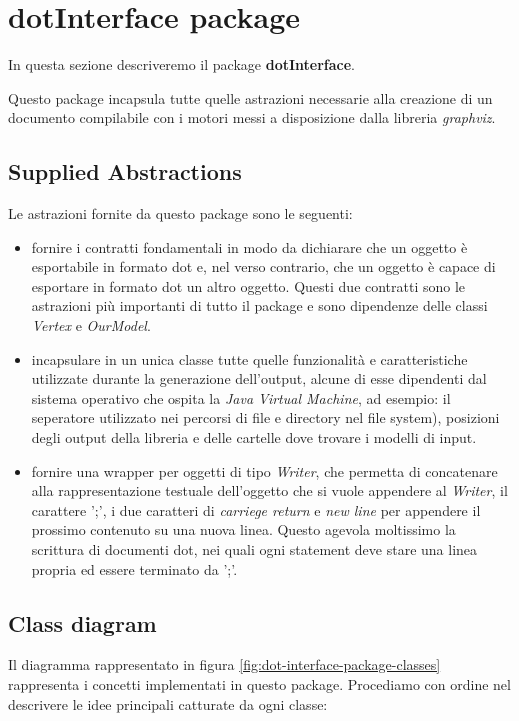 \section{dotInterface package}

In questa sezione descriveremo il package \textbf{dotInterface}.

Questo package incapsula tutte quelle astrazioni necessarie alla
creazione di un documento compilabile con i motori messi a
disposizione dalla libreria \emph{graphviz}.

\subsection{Supplied Abstractions}

Le astrazioni fornite da questo package sono le seguenti:
\begin{itemize}
\item fornire i contratti fondamentali in modo da dichiarare che un
  oggetto \`e esportabile in formato dot e, nel verso contrario, che
  un oggetto \`e capace di esportare in formato dot un altro
  oggetto. Questi due contratti sono le astrazioni pi\`u importanti di
  tutto il package e sono dipendenze delle classi \emph{Vertex} e
  \emph{OurModel}.
\item incapsulare in un unica classe tutte quelle funzionalit\`a e
  caratteristiche utilizzate durante la generazione dell'output,
  alcune di esse dipendenti dal sistema operativo che ospita la
  \emph{Java Virtual Machine}, ad esempio: il seperatore utilizzato
  nei percorsi di file e directory nel file system), posizioni degli
  output della libreria e delle cartelle dove trovare i modelli di
  input.
\item fornire una wrapper per oggetti di tipo \emph{Writer}, che
  permetta di concatenare alla rappresentazione testuale dell'oggetto
  che si vuole appendere al \emph{Writer}, il carattere ';', i due
  caratteri di \emph{carriege return} e \emph{new line} per appendere
  il prossimo contenuto su una nuova linea. Questo agevola moltissimo
  la scrittura di documenti dot, nei quali ogni statement deve stare
  una linea propria ed essere terminato da ';'.
\end{itemize}

\subsection{Class diagram}
Il diagramma rappresentato in figura \ref{fig:dot-interface-package-classes}
rappresenta i concetti implementati in questo package. Procediamo con
ordine nel descrivere le idee principali catturate da ogni classe:

